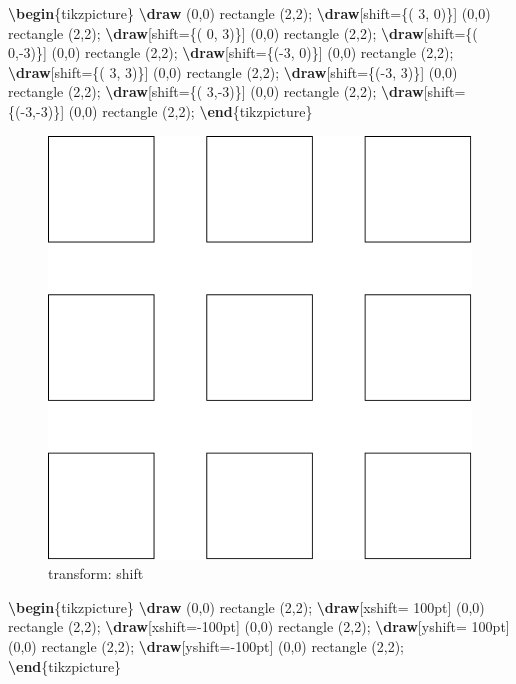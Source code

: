 \documentclass[
]{book}
\newenvironment{Shaded}{\begin{snugshade}}{\end{snugshade}}
\newcommand{\ExtensionTok}[1]{#1}
\newcommand{\FunctionTok}[1]{\textcolor[rgb]{0.13,0.29,0.53}{\textbf{#1}}}
\newcommand{\KeywordTok}[1]{\textcolor[rgb]{0.13,0.29,0.53}{\textbf{#1}}}
\newcommand{\NormalTok}[1]{#1}
\theoremstyle{definition}
\theoremstyle{definition}
\theoremstyle{definition}
\theoremstyle{definition}
\theoremstyle{remark}
\begin{document}
\begin{Shaded}
\begin{Highlighting}[]
\KeywordTok{\textbackslash{}begin}\NormalTok{\{}\ExtensionTok{tikzpicture}\NormalTok{\}}
  \FunctionTok{\textbackslash{}draw}\NormalTok{ (0,0) rectangle (2,2);}
  \FunctionTok{\textbackslash{}draw}\NormalTok{[shift=\{( 3, 0)\}] (0,0) rectangle (2,2);}
  \FunctionTok{\textbackslash{}draw}\NormalTok{[shift=\{( 0, 3)\}] (0,0) rectangle (2,2);}
  \FunctionTok{\textbackslash{}draw}\NormalTok{[shift=\{( 0,{-}3)\}] (0,0) rectangle (2,2);}
  \FunctionTok{\textbackslash{}draw}\NormalTok{[shift=\{({-}3, 0)\}] (0,0) rectangle (2,2);}
  \FunctionTok{\textbackslash{}draw}\NormalTok{[shift=\{( 3, 3)\}] (0,0) rectangle (2,2);}
  \FunctionTok{\textbackslash{}draw}\NormalTok{[shift=\{({-}3, 3)\}] (0,0) rectangle (2,2);}
  \FunctionTok{\textbackslash{}draw}\NormalTok{[shift=\{( 3,{-}3)\}] (0,0) rectangle (2,2);}
  \FunctionTok{\textbackslash{}draw}\NormalTok{[shift=\{({-}3,{-}3)\}] (0,0) rectangle (2,2);}
\KeywordTok{\textbackslash{}end}\NormalTok{\{}\ExtensionTok{tikzpicture}\NormalTok{\}}
\end{Highlighting}
\end{Shaded}

\begin{figure}
\includegraphics[width=0.75\linewidth]{202401311000-TikZ_files/figure-latex/unnamed-chunk-45-1} \caption{transform: shift}\label{fig:unnamed-chunk-45}
\end{figure}

\begin{Shaded}
\begin{Highlighting}[]
\KeywordTok{\textbackslash{}begin}\NormalTok{\{}\ExtensionTok{tikzpicture}\NormalTok{\}}
  \FunctionTok{\textbackslash{}draw}\NormalTok{ (0,0) rectangle (2,2);}
  \FunctionTok{\textbackslash{}draw}\NormalTok{[xshift= 100pt] (0,0) rectangle (2,2);}
  \FunctionTok{\textbackslash{}draw}\NormalTok{[xshift={-}100pt] (0,0) rectangle (2,2);}
  \FunctionTok{\textbackslash{}draw}\NormalTok{[yshift= 100pt] (0,0) rectangle (2,2);}
  \FunctionTok{\textbackslash{}draw}\NormalTok{[yshift={-}100pt] (0,0) rectangle (2,2);}
\KeywordTok{\textbackslash{}end}\NormalTok{\{}\ExtensionTok{tikzpicture}\NormalTok{\}}
\end{Highlighting}
\end{Shaded}
\end{document}
